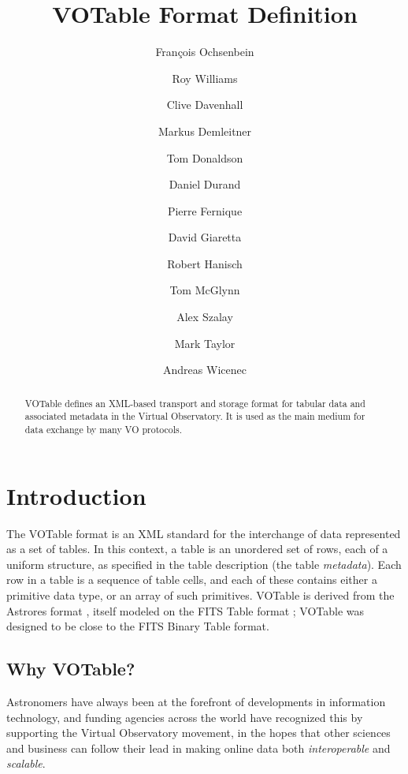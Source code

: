 \documentclass[11pt,a4paper]{ivoa}
\title{VOTable Format Definition}
\author[http://www.ivoa.net/twiki/bin/view/IVOA/FrancoisOchsenbein]
                                               {Fran\c{c}ois Ochsenbein}
\author[http://www.ivoa.net/twiki/bin/view/IVOA/RoyWilliams]{Roy Williams}
\author[http://www.ivoa.net/twiki/bin/view/IVOA/CliveDavenhall]{Clive Davenhall}
\author[http://www.ivoa.net/twiki/bin/view/IVOA/MarkusDemleitner]
                                               {Markus Demleitner}
\author[http://www.ivoa.net/twiki/bin/view/IVOA/TomDonaldson]{Tom Donaldson}
\author[http://www.ivoa.net/twiki/bin/view/IVOA/DanielDurand]{Daniel Durand}
\author[http://www.ivoa.net/twiki/bin/view/IVOA/PierreFernique]{Pierre Fernique}
\author[http://www.ivoa.net/twiki/bin/view/IVOA/DavidGiaretta]{David Giaretta}
\author[http://www.ivoa.net/twiki/bin/view/IVOA/BobHanisch]{Robert Hanisch}
\author[http://www.ivoa.net/twiki/bin/view/IVOA/TomMcGlynn]{Tom McGlynn}
\author[http://www.ivoa.net/twiki/bin/view/IVOA/AlexSzalay]{Alex Szalay}
\author[http://www.ivoa.net/twiki/bin/view/IVOA/MarkTaylor]{Mark Taylor}
\author[http://www.ivoa.net/twiki/bin/view/IVOA/AndreasWicenec]{Andreas Wicenec}
\begin{document}
\begin{abstract}
VOTable defines an XML-based transport and storage format for
tabular data and associated metadata in the Virtual Observatory.
It is used as the main medium for data exchange by many VO protocols.
\end{abstract}


%
%
%


\section{Introduction}

The VOTable format is an XML standard for the interchange of data
represented as a set of tables.
In this context, a table is an unordered set of rows, each of
a uniform structure, as specified in the table description
(the table {\em metadata}).
Each row in a table is a sequence of table cells, and each of these contains
either a primitive data type, or an array of such primitives.
VOTable is derived from the
Astrores format \citep{astrores}, itself modeled on the FITS Table format
\citep{std:FITS};
VOTable was designed to be close to the FITS Binary Table format.

\subsection{Why VOTable?}

Astronomers have always been at the forefront of developments in
information technology, and funding agencies across the world have
recognized this by supporting the Virtual Observatory movement, in
the hopes that other sciences and business can follow their lead in
making online data both {\it interoperable} and {\it scalable}.
\end{document}
